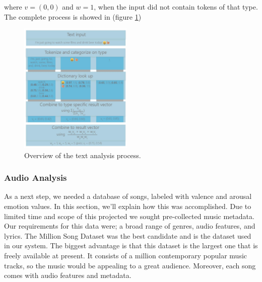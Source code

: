 \documentclass[10pt,journal,compsoc]{IEEEtran}
\begin{document}
where $v = (0,0)$ and $w = 1$, when the input did not contain tokens of that type. The complete process is showed in (figure \ref{fig:ta})

\begin{figure}[h!]
	\centering
	\includegraphics[width=0.48\textwidth]{"TextAnalysisOverview"}
	\caption{Overview of the text analysis process.}
	\label{fig:ta}
\end{figure}





\subsubsection{Audio Analysis}

As a next step, we needed a database of songs, labeled with valence and arousal emotion values. In this section, we'll explain how this was accomplished.  Due to limited time and scope of this projected we sought pre-collected music metadata. Our requirements for this data were; a broad range of genres, audio features, and lyrics. The Million Song Dataset \cite{Thierry} was the best candidate and is the dataset used in our system. The biggest advantage is that this dataset is the largest one that is freely available at present. It consists of a million contemporary popular music tracks, so the music would be appealing to a great audience. Moreover, each song comes with audio features and metadata.
\end{document}
